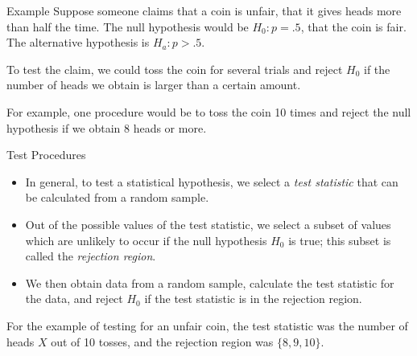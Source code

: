 \documentclass[t,handout]{beamer}
\begin{document}
    \begin{frame}{Example}
        Suppose someone claims that a coin is unfair, that it gives heads more than half the time. \pause The null hypothesis would be $H_0: p=.5$, that the coin is fair. \pause The alternative hypothesis is $H_a: p>.5$.
        
        \vspace{.2cm}
        \pause To test the claim, we could toss the coin for several trials and reject $H_0$ if the number of heads we obtain is larger than a certain amount. 
        
        \vspace{.2cm}
        \pause For example, one procedure would be to toss the coin 10 times and reject the null hypothesis if we obtain 8 heads or more.
        \end{frame}

        \begin{frame}{Test Procedures}
            \begin{itemize}
            \item In general, to test a statistical hypothesis, we select a \emph{test statistic} that can be calculated from a random sample. 
            
            \pause \item Out of the possible values of the test statistic, we select a subset of values which are unlikely to occur if the null hypothesis $H_0$ is true; this subset is called the \emph{rejection region}. 
            
            \pause\item We then obtain data from a random sample, calculate the test statistic for the data, and reject $H_0$ if the test statistic is in the rejection region.
            \end{itemize}
            
            \pause For the example of testing for an unfair coin, the test statistic was the number of heads $X$ out of 10 tosses, and the rejection region was $\{8,9,10\}$.
            \end{frame}
            
\end{document}
